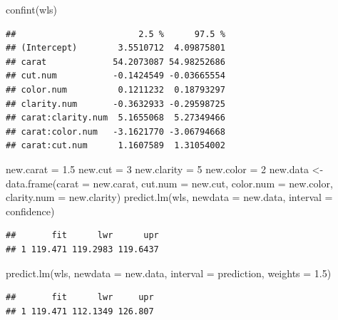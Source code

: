 \documentclass[
]{book}
\newenvironment{Shaded}{\begin{snugshade}}{\end{snugshade}}
\newcommand{\AttributeTok}[1]{\textcolor[rgb]{0.77,0.63,0.00}{#1}}
\newcommand{\DecValTok}[1]{\textcolor[rgb]{0.00,0.00,0.81}{#1}}
\newcommand{\FloatTok}[1]{\textcolor[rgb]{0.00,0.00,0.81}{#1}}
\newcommand{\FunctionTok}[1]{\textcolor[rgb]{0.00,0.00,0.00}{#1}}
\newcommand{\NormalTok}[1]{#1}
\newcommand{\OtherTok}[1]{\textcolor[rgb]{0.56,0.35,0.01}{#1}}
\newcommand{\StringTok}[1]{\textcolor[rgb]{0.31,0.60,0.02}{#1}}
\begin{document}
\begin{Shaded}
\begin{Highlighting}[]
\FunctionTok{confint}\NormalTok{(wls)}
\end{Highlighting}
\end{Shaded}

\begin{verbatim}
##                        2.5 %      97.5 %
## (Intercept)        3.5510712  4.09875801
## carat             54.2073087 54.98252686
## cut.num           -0.1424549 -0.03665554
## color.num          0.1211232  0.18793297
## clarity.num       -0.3632933 -0.29598725
## carat:clarity.num  5.1655068  5.27349466
## carat:color.num   -3.1621770 -3.06794668
## carat:cut.num      1.1607589  1.31054002
\end{verbatim}

\begin{Shaded}
\begin{Highlighting}[]
\NormalTok{new.carat }\OtherTok{=} \FloatTok{1.5}
\NormalTok{new.cut }\OtherTok{=} \DecValTok{3}
\NormalTok{new.clarity }\OtherTok{=} \DecValTok{5}
\NormalTok{new.color }\OtherTok{=} \DecValTok{2}
\NormalTok{new.data }\OtherTok{\textless{}{-}} \FunctionTok{data.frame}\NormalTok{(}\AttributeTok{carat =}\NormalTok{ new.carat, }\AttributeTok{cut.num =}\NormalTok{ new.cut, }\AttributeTok{color.num =}\NormalTok{ new.color, }\AttributeTok{clarity.num =}\NormalTok{ new.clarity)}
\FunctionTok{predict.lm}\NormalTok{(wls, }\AttributeTok{newdata =}\NormalTok{ new.data, }\AttributeTok{interval =} \StringTok{\textquotesingle{}confidence\textquotesingle{}}\NormalTok{)}
\end{Highlighting}
\end{Shaded}

\begin{verbatim}
##       fit      lwr      upr
## 1 119.471 119.2983 119.6437
\end{verbatim}

\begin{Shaded}
\begin{Highlighting}[]
\FunctionTok{predict.lm}\NormalTok{(wls, }\AttributeTok{newdata =}\NormalTok{ new.data, }\AttributeTok{interval =} \StringTok{\textquotesingle{}prediction\textquotesingle{}}\NormalTok{, }\AttributeTok{weights =} \FloatTok{1.5}\NormalTok{)}
\end{Highlighting}
\end{Shaded}

\begin{verbatim}
##       fit      lwr     upr
## 1 119.471 112.1349 126.807
\end{verbatim}
\end{document}
